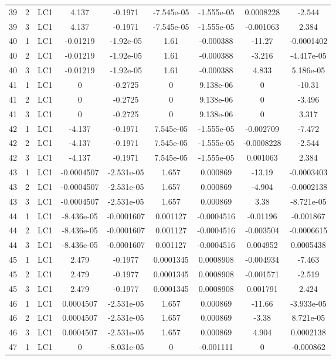 \documentclass{article}%
\begin{document}
\begin{longtable}{| c c c | c c c c c c |}
39&2&LC1&4.137&{-}0.1971&{-}7.545e{-}05&{-}1.555e{-}05&0.0008228&{-}2.544\\%
39&3&LC1&4.137&{-}0.1971&{-}7.545e{-}05&{-}1.555e{-}05&{-}0.001063&2.384\\%
40&1&LC1&{-}0.01219&{-}1.92e{-}05&1.61&{-}0.000388&{-}11.27&{-}0.0001402\\%
40&2&LC1&{-}0.01219&{-}1.92e{-}05&1.61&{-}0.000388&{-}3.216&{-}4.417e{-}05\\%
40&3&LC1&{-}0.01219&{-}1.92e{-}05&1.61&{-}0.000388&4.833&5.186e{-}05\\%
41&1&LC1&0&{-}0.2725&0&9.138e{-}06&0&{-}10.31\\%
41&2&LC1&0&{-}0.2725&0&9.138e{-}06&0&{-}3.496\\%
41&3&LC1&0&{-}0.2725&0&9.138e{-}06&0&3.317\\%
42&1&LC1&{-}4.137&{-}0.1971&7.545e{-}05&{-}1.555e{-}05&{-}0.002709&{-}7.472\\%
42&2&LC1&{-}4.137&{-}0.1971&7.545e{-}05&{-}1.555e{-}05&{-}0.0008228&{-}2.544\\%
42&3&LC1&{-}4.137&{-}0.1971&7.545e{-}05&{-}1.555e{-}05&0.001063&2.384\\%
43&1&LC1&{-}0.0004507&{-}2.531e{-}05&1.657&0.000869&{-}13.19&{-}0.0003403\\%
43&2&LC1&{-}0.0004507&{-}2.531e{-}05&1.657&0.000869&{-}4.904&{-}0.0002138\\%
43&3&LC1&{-}0.0004507&{-}2.531e{-}05&1.657&0.000869&3.38&{-}8.721e{-}05\\%
44&1&LC1&{-}8.436e{-}05&{-}0.0001607&0.001127&{-}0.0004516&{-}0.01196&{-}0.001867\\%
44&2&LC1&{-}8.436e{-}05&{-}0.0001607&0.001127&{-}0.0004516&{-}0.003504&{-}0.0006615\\%
44&3&LC1&{-}8.436e{-}05&{-}0.0001607&0.001127&{-}0.0004516&0.004952&0.0005438\\%
45&1&LC1&2.479&{-}0.1977&0.0001345&0.0008908&{-}0.004934&{-}7.463\\%
45&2&LC1&2.479&{-}0.1977&0.0001345&0.0008908&{-}0.001571&{-}2.519\\%
45&3&LC1&2.479&{-}0.1977&0.0001345&0.0008908&0.001791&2.424\\%
46&1&LC1&0.0004507&{-}2.531e{-}05&1.657&0.000869&{-}11.66&{-}3.933e{-}05\\%
46&2&LC1&0.0004507&{-}2.531e{-}05&1.657&0.000869&{-}3.38&8.721e{-}05\\%
46&3&LC1&0.0004507&{-}2.531e{-}05&1.657&0.000869&4.904&0.0002138\\%
47&1&LC1&0&{-}8.031e{-}05&0&{-}0.001111&0&{-}0.000862\\%

\end{longtable}
\end{document}
